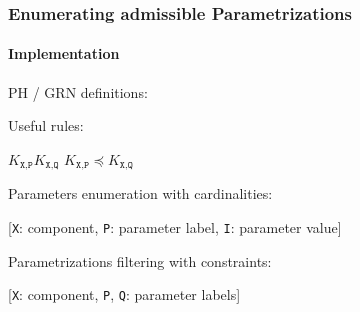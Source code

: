 \begin{frame}[c]
  \frametitle{Enumerating admissible Parametrizations}
  \framesubtitle{Implementation}

PH / GRN definitions:

\texttt{}

\bigskip
Useful rules:

\texttt{} $K_{\texttt{X},\texttt{P}}$$K_{\texttt{X},\texttt{Q}}$\texttt{} $K_{\texttt{X},\texttt{P}} \preccurlyeq K_{\texttt{X},\texttt{Q}}$

\pause
\bigskip
Parameters enumeration with cardinalities:

\texttt{}

[\texttt{X}: component, \texttt{P}: parameter label, \texttt{I}: parameter value]

\pause
\bigskip
Parametrizations filtering with constraints:

\texttt{}

[\texttt{X}: component, \texttt{P}, \texttt{Q}: parameter labels]

\end{frame}
